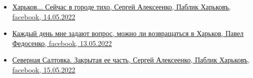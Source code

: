 \begin{itemize}
\item \hyperlink{14_05_2022.fb.fb_group.pablik_harkov.1.harkov_tiho}{%
Харьков... Сейчас в городе тихо, Сергей Алексеенко, Паблик Харьковъ, facebook, 14.05.2022%
}

\item \hyperlink{13_05_2022.fb.fedosenko_pavel.harkov.newsroom.1.vopros_harkov}{%
Каждый день мне задают вопрос, можно ли возвращаться в Харьков, Павел Федосенко, facebook, 13.05.2022%
}

\item \hyperlink{15_05_2022.fb.fb_group.pablik_harkov.1.saltovka}{%
Северная Салтовка. Закрытая ее часть, Сергей Алексеенко, Паблик Харьковъ, facebook, 15.05.2022%
}

\end{itemize} %

